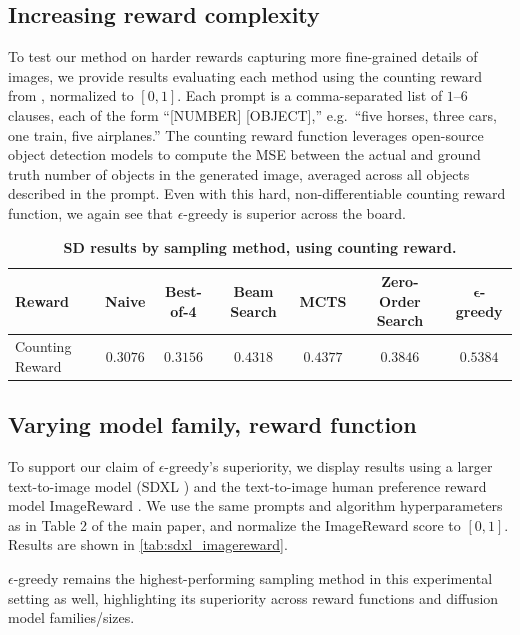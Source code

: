 \documentclass{article}
\begin{document}
\subsection{Increasing reward complexity}

To test our method on harder rewards capturing more fine-grained details of images, we provide results evaluating each method using the counting reward from \citep{kim2025}, normalized to $[0,1]$.
Each prompt is a comma-separated list of $1$--$6$ clauses, each of the form ``[NUMBER] [OBJECT],'' 
e.g.\ ``five horses, three cars, one train, five airplanes.'' The counting reward function leverages open-source object detection models to compute the MSE between the actual and ground truth number of objects in the generated image, averaged across all objects described in the prompt. Even with this hard, non-differentiable counting reward function, we again see that $\epsilon$-greedy is superior across the board.

\begin{table}[h]
  \centering
  \caption{\small \textbf{SD results by sampling method, using counting reward.}}
  \label{tab:sd_counting}
  \begin{tabular}{lcccccc}
    \toprule
    \textbf{Reward} & \textbf{Naive} & \textbf{Best-of-4} & \textbf{Beam Search} & \textbf{MCTS} & \textbf{Zero-Order Search} & $\bm{\epsilon}$\textbf{-greedy} \\
    \midrule
    Counting Reward & $0.3076$ & $0.3156$ & $0.4318$ & $0.4377$ & $0.3846$ & $\mathbf{0.5384}$ \\
    \bottomrule
  \end{tabular}
\end{table}

\subsection{Varying model family, reward function}

To support our claim of $\epsilon$-greedy's superiority, we display results using a larger text-to-image model (SDXL \citep{podell2023sdxlimprovinglatentdiffusion}) and the text-to-image human preference reward model ImageReward \citep{xu2023imagerewardlearningevaluatinghuman}. We use the same prompts and algorithm hyperparameters as in Table 2 of the main paper, and normalize the ImageReward score to $[0,1]$. Results are shown in \autoref{tab:sdxl_imagereward}.

$\epsilon$-greedy remains the highest-performing sampling method in this experimental setting as well, highlighting its superiority across reward functions and diffusion model families/sizes.
\end{document}
